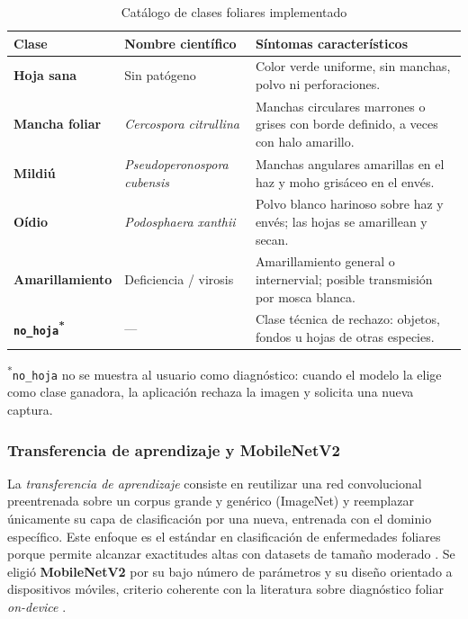 \documentclass[12pt,a4paper]{article}
\begin{document}
\begin{table}[H]
\centering
\caption{Catálogo de clases foliares implementado}
\label{tab:enfermedades}
\renewcommand{\arraystretch}{1.4}
\begin{tabular}{>{\bfseries}p{3.0cm} p{3.9cm} p{6.2cm}}
\toprule
\normalfont\bfseries Clase & \bfseries\normalfont Nombre científico & \bfseries\normalfont Síntomas característicos \\
\midrule
Hoja sana & Sin patógeno & Color verde uniforme, sin manchas, polvo ni perforaciones. \\
Mancha foliar & \textit{Cercospora citrullina} & Manchas circulares marrones o grises con borde definido, a veces con halo amarillo. \\
Mildiú & \textit{Pseudoperonospora cubensis} & Manchas angulares amarillas en el haz y moho grisáceo en el envés. \\
Oídio & \textit{Podosphaera xanthii} & Polvo blanco harinoso sobre haz y envés; las hojas se amarillean y secan. \\
Amarillamiento & Deficiencia / virosis & Amarillamiento general o internervial; posible transmisión por mosca blanca. \\
\midrule
\texttt{no\_hoja}\textsuperscript{*} & --- & Clase técnica de rechazo: objetos, fondos u hojas de otras especies. \\
\bottomrule
\end{tabular}
\end{table}
{\footnotesize\textsuperscript{*}\texttt{no\_hoja} no se muestra al usuario como
diagnóstico: cuando el modelo la elige como clase ganadora, la aplicación
rechaza la imagen y solicita una nueva captura.}

\subsubsection{Transferencia de aprendizaje y MobileNetV2}

La \textit{transferencia de aprendizaje} consiste en reutilizar una red
convolucional preentrenada sobre un corpus grande y genérico (ImageNet) y
reemplazar únicamente su capa de clasificación por una nueva, entrenada con el
dominio específico. Este enfoque es el estándar en clasificación de enfermedades
foliares porque permite alcanzar exactitudes altas con datasets de tamaño
moderado \cite{cnn2021transfer}. Se eligió \textbf{MobileNetV2} por su bajo
número de parámetros y su diseño orientado a dispositivos móviles, criterio
coherente con la literatura sobre diagnóstico foliar \textit{on-device}
\cite{pumpkinxai2025}.
\end{document}
